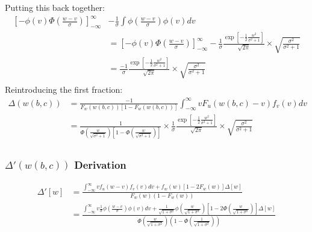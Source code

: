 Putting this back together:
\begin{align*}
 \left[
        -\phi(v) \Phi\left(\frac{w-v}{\sigma}\right) 
    \right]^\infty_{-\infty} &-\frac{1}{\sigma} \int \phi\left(\frac{w - v}{\sigma}\right) \phi(v) dv  
     \\
    &=
 \left[
        -\phi(v) \Phi\left(\frac{w-v}{\sigma}\right) 
    \right]^\infty_{-\infty} -
    \frac{1}{\sigma} \frac{
        \exp \left[
            -\frac{1}{2}\frac{w^2}{\sigma^2 + 1}
        \right]
    }{\sqrt{2\pi}} \times 
                    \sqrt{
                        \frac{\sigma^2}{\sigma^2 + 1}
                    }  \\
&=
    \frac{-1}{\sigma} \frac{
        \exp \left[
            -\frac{1}{2}\frac{w^2}{\sigma^2 + 1}
        \right]
    }{\sqrt{2\pi}} \times 
                    \sqrt{
                        \frac{\sigma^2}{\sigma^2 + 1}
                    }  \\
\end{align*}
Reintroducing the first fraction:
\begin{align*}
    \Delta(w(b,c)) &= \frac{
        -1
    }{
        F_w(w(b,c)) [1 - F_w(w(b,c))]
    } \int^\infty_{-\infty} vF_u(w(b,c) - v) f_v(v) dv \\
     &= 
\frac{
        1
    }{
        \Phi\left(\frac{w}{\sqrt{\sigma^2 + 1}}\right)
         \left[1 - \Phi\left(\frac{
            w
        }{
            \sqrt{\sigma^2 + 1}
        }\right)\right]
    } \times 
    \frac{1}{\sigma} \frac{
        \exp \left[
            -\frac{1}{2}\frac{w^2}{\sigma^2 + 1}
        \right]
    }{\sqrt{2\pi}} \times 
                    \sqrt{
                        \frac{\sigma^2}{\sigma^2 + 1}
                    }  \\
\end{align*}

\subsubsection{$\Delta'(w(b,c))$ Derivation}

\begin{align*}
   \Delta'[w] &= 
   \frac{
    \int^\infty_{-\infty} v f_u(w - v) f_v(v) dv 
    + f_w(w) \left[
        1 - 2 F_w(w)
    \right] \Delta[w]
   }{
    F_w(w)(1 - F_w(w))
   } \\
   &= 
   \frac{
    \int^\infty_{-\infty} v \frac{1}{\sigma}\phi\left(\frac{w - v}{\sigma}\right) \phi(v) dv 
    + \frac{1}{\sqrt{1 + \sigma^2}}\phi\left(\frac{w}{\sqrt{1 + \sigma^2}}\right) \left[
        1 - 2 \Phi(\frac{w}{\sqrt{1 + \sigma^2}})
    \right] \Delta[w]
   }{
    \Phi\left(\frac{w}{\sqrt{1 + \sigma^2}}\right)\left(1 - \Phi\left(\frac{1}{\sqrt{1 + \sigma^2}}\right)\right)
   } \\
\end{align*}


